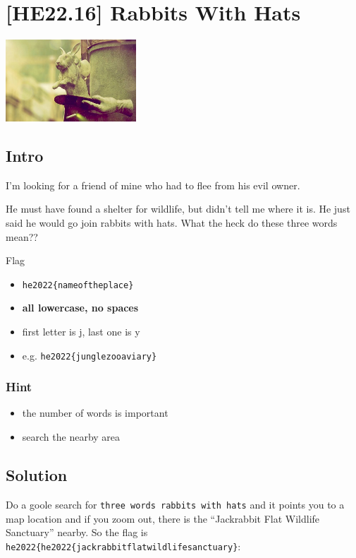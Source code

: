 
\hypertarget{he22.16}{%
\chapter{[HE22.16] Rabbits With Hats}\label{he22.16}}

\begin{marginfigure}
	\includegraphics[width=49mm]{level5/challenge16.jpg}
\end{marginfigure}
\section{Intro}
I'm looking for a friend of mine who had to flee from his evil owner.

He must have found a shelter for wildlife, but didn't tell me where it is. He
just said he would go join rabbits with hats. What the heck do these three
words mean??

 Flag
\begin{itemize}
\item \verb+he2022{nameoftheplace}+
\item \textbf{all lowercase, no spaces}
\item first letter is j, last one is y
\item e.g. \verb+he2022{junglezooaviary}+
\end{itemize}

\subsection{Hint}
\begin{itemize}
\item the number of words is important
\item search the nearby area
\end{itemize}    

\section{Solution}\label{hv22.16solution}
Do a goole search for \verb+three words rabbits with hats+ and it points you
to a map location and if you zoom out, there is the ``Jackrabbit Flat Wildlife
Sanctuary'' nearby.  So the flag is
\verb+he2022{he2022{jackrabbitflatwildlifesanctuary}+:


	









